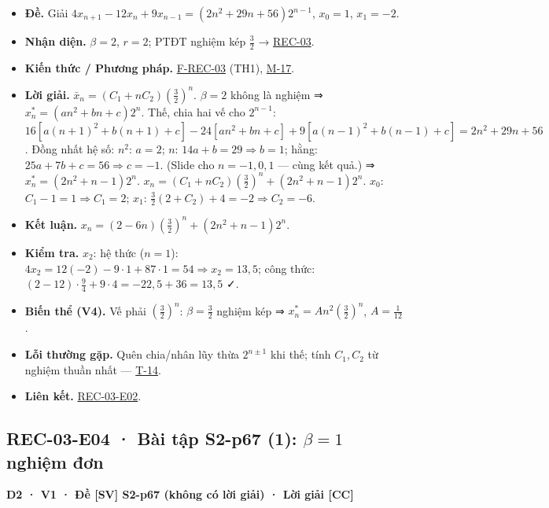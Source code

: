 \documentclass[
  10pt,
  twoside,openany]{book}
\providecommand{\tightlist}{%
  \setlength{\itemsep}{0pt}\setlength{\parskip}{0pt}}
\begin{document}
\begin{itemize}
\tightlist
\item
  \textbf{Đề.} Giải \(4x_{n+1}-12x_n+9x_{n-1}=(2n^2+29n+56)2^{n-1}\),
  \(x_0=1\), \(x_1=-2\).
\item
  \textbf{Nhận diện.} \(\beta=2\), \(r=2\); PTĐT nghiệm kép \(\frac32\)
  → \protect\hyperlink{REC-03}{REC-03}.
\item
  \textbf{Kiến thức / Phương pháp.}
  \protect\hyperlink{F-REC-03}{F-REC-03} (TH1),
  \protect\hyperlink{M-17}{M-17}.
\item
  \textbf{Lời giải.} \(\bar x_n=(C_1+nC_2)\left(\frac32\right)^n\).
  \(\beta=2\) không là nghiệm ⇒ \(x_n^*=(an^2+bn+c)2^n\). Thế, chia hai
  vế cho \(2^{n-1}\):
  \(16[a(n+1)^2+b(n+1)+c]-24[an^2+bn+c]+9[a(n-1)^2+b(n-1)+c]=2n^2+29n+56\).
  Đồng nhất hệ số: \(n^2\): \(a=2\); \(n\): \(14a+b=29\Rightarrow b=1\);
  hằng: \(25a+7b+c=56\Rightarrow c=-1\). (Slide cho \(n=-1,0,1\) ---
  cùng kết quả.) ⇒ \(x_n^*=(2n^2+n-1)2^n\).
  \(x_n=(C_1+nC_2)\left(\frac32\right)^n+(2n^2+n-1)2^n\). \(x_0\):
  \(C_1-1=1\Rightarrow C_1=2\); \(x_1\):
  \(\frac32(2+C_2)+4=-2\Rightarrow C_2=-6\).
\item
  \textbf{Kết luận.} \(x_n=(2-6n)\left(\frac32\right)^n+(2n^2+n-1)2^n\).
\item
  \textbf{Kiểm tra.} \(x_2\): hệ thức (\(n=1\)):
  \(4x_2=12(-2)-9\cdot1+87\cdot1=54\Rightarrow x_2=13{,}5\); công thức:
  \((2-12)\cdot\frac94+9\cdot4=-22{,}5+36=13{,}5\) ✓.
\item
  \textbf{Biến thể (V4).} Vế phải \(\left(\frac32\right)^n\):
  \(\beta=\frac32\) nghiệm kép ⇒ \(x_n^*=An^2\left(\frac32\right)^n\),
  \(A=\frac1{12}\).
\item
  \textbf{Lỗi thường gặp.} Quên chia/nhân lũy thừa \(2^{n\pm1}\) khi
  thế; tính \(C_1,C_2\) từ nghiệm thuần nhất ---
  \protect\hyperlink{T-14}{T-14}.
\item
  \textbf{Liên kết.} \protect\hyperlink{REC-03-E02}{REC-03-E02}.
\end{itemize}

\hypertarget{REC-03-E04}{%
\subsection{\texorpdfstring{REC-03-E04 · Bài tập S2-p67 (1): \(\beta=1\)
nghiệm
đơn}{REC-03-E04 · Bài tập S2-p67 (1): \textbackslash beta=1 nghiệm đơn}}\label{REC-03-E04}}

\textbf{D2 · V1 · Đề {[}SV{]} S2-p67 (không có lời giải) · Lời giải
{[}CC{]}}
\end{document}
